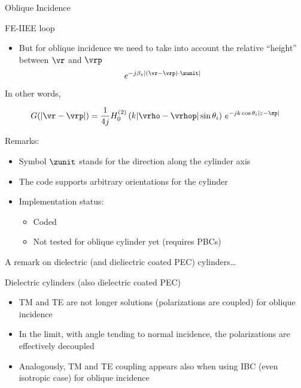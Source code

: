 \begin{frame}[allowframebreaks]{Oblique Incidence}
\begin{block}{FE-IIEE loop}
\begin{itemize}
      \item But for oblique incidence we need to take into account the
        relative ``height'' between $\vr$ and $\vrp$
        \begin{equation*}
          e^{-j\beta_z|(\vr-\vrp)\cdot\zunit|}
        \end{equation*}
      \end{itemize}
    \end{block}
    
    \begin{block}{In other words,}
      
      \begin{equation*}
        G(|\vr-\vrp|) = \dfrac{1}{4j}
        H_0^{(2)}\left( k|\vrho-\vrhop|\sin\theta_i\right) \,
        e^{-j k \cos\theta_i |z-\zp|}
      \end{equation*}

      Remarks:
      \begin{itemize}
      \item Symbol $\zunit$ stands for the direction along the
        cylinder axis
      \item The code supports arbitrary orientations for the cylinder
      \end{itemize}
    \end{block}

    \begin{itemize}
    \item Implementation status:
      \begin{itemize}
      \item Coded
      \item Not tested for oblique cylinder yet (requires PBCs)
      \end{itemize}
    \end{itemize}
      

    \framebreak %

   \large{A remark on dielectric (and dieliectric coated PEC) cylinders\ldots}
    
   \begin{block}{Dielectric cylinders (also dielectric coated PEC)}
     \begin{itemize}
     \item TM and TE are not longer solutions (\alert{polarizations are
       coupled})  for oblique incidence

   \item In the limit, with angle tending to normal incidence, the
     polarizations are effectively decoupled

   \item Analogously, TM and TE coupling appears also when using IBC (even
     isotropic case) for oblique incidence

     \end{itemize}
   \end{block}

  
\end{frame}
  
